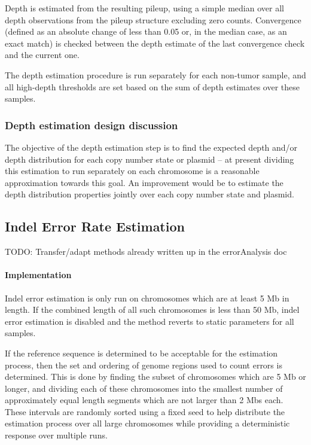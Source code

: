 \documentclass{article}
\begin{document}
Depth is estimated from the resulting pileup, using a simple median over all depth observations from the pileup structure excluding zero counts. Convergence (defined as an absolute change of less than 0.05 or, in the median case, as an exact match) is checked between the depth estimate of the last convergence check and the current one.

The depth estimation procedure is run separately for each non-tumor sample, and all high-depth thresholds are set based on the sum of depth estimates over these samples.


\subsubsection{Depth estimation design discussion}

The objective of the depth estimation step is to find the expected depth and/or depth distribution for each copy number state or plasmid -- at present dividing this estimation to run separately on each chromosome is a reasonable approximation towards this goal. An improvement would be to estimate the depth distribution properties jointly over each copy number state and plasmid.


\subsection{Indel Error Rate Estimation}

TODO: Transfer/adapt methods already written up in the errorAnalysis doc

\paragraph{Implementation}

Indel error estimation is only run on chromosomes which are at least 5 Mb in length. If the combined length of all such chromosomes is less than 50 Mb, indel error estimation is disabled and the method reverts to static parameters for all samples.

If the reference sequence is determined to be acceptable for the estimation process, then the set and ordering of genome regions used to count errors is determined. This is done by finding the subset of chromosomes which are 5 Mb or longer, and dividing each of these chromosomes into the smallest number of approximately equal length segments which are not larger than 2 Mbs each. These intervals are randomly sorted using a fixed seed to help distribute the estimation process over all large chromosomes while providing a deterministic response over multiple runs.
\end{document}
